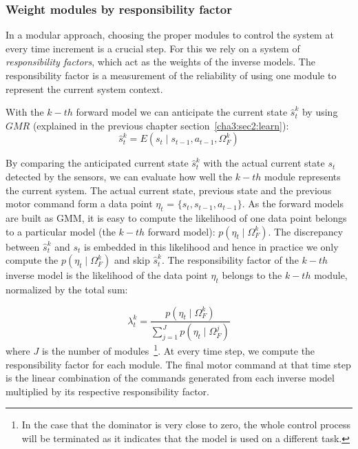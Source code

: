 \subsubsection{Weight modules by responsibility factor}
\label{cha4:sec2:control:rf}

In a modular approach, choosing the proper modules to control the
system at every time increment is a crucial step. For this we rely on
a system of {\em responsibility factors}, which act as the weights of
the inverse models. The responsibility factor is a measurement of the
reliability of using one module to represent the current system
context.

With the $k-{th}$ forward model we can anticipate the current state ${\hat{s}} ^k_t$ by using $GMR$ (explained in the previous chapter section~\ref{cha3:sec2:learn}):
\begin{equation}
\label{e3}
{\hat{s}} ^k_{t} = E\left({s_t {\mid} s_{t-1}, a_{t-1}, \Omega^k_F}\right)
\end{equation}

By comparing the anticipated current state ${\hat{s}} ^k_t$ with the
actual current state $s_t$ detected by the sensors, we can evaluate
how well the $k-{th}$ module represents the current system. The actual
current state, previous state and the previous motor command form a
data point $\eta_t$ = $\{s_t,s_{t-1},a_{t-1}\}$. As the forward models
are built as GMM, it is easy to compute the likelihood of one data
point belongs to a particular model (the $k-th$ forward model): $p(\eta_t {\mid}
\Omega_F^k)$. The discrepancy between $\hat{s}^k_t$ and $s_t$ is
embedded in this likelihood and hence in practice we only compute the
$p(\eta_t {\mid} \Omega_F^k)$ and skip ${\hat{s}} ^k_t$.  The
responsibility factor of the $k-{th}$ inverse model is the likelihood of
the data point $\eta_t$ belongs to the $k-{th}$ module, normalized by
the total sum:

\begin{equation}
\lambda^k_t = \frac{p(\eta_t {\mid} \Omega_F^k)}{\sum_{j=1}^{J}{p(\eta_t {\mid} \Omega_F^j)}}
\end{equation}
where $J$ is the number of modules~\footnote{In the case that the
  dominator is very close to zero, the whole control process will be
  terminated as it indicates that the model is used on a different
  task.}.  At every time step, we compute the responsibility factor
for each module. The final motor command at that time step is the
linear combination of the commands generated from each inverse model
multiplied by its respective responsibility factor.

